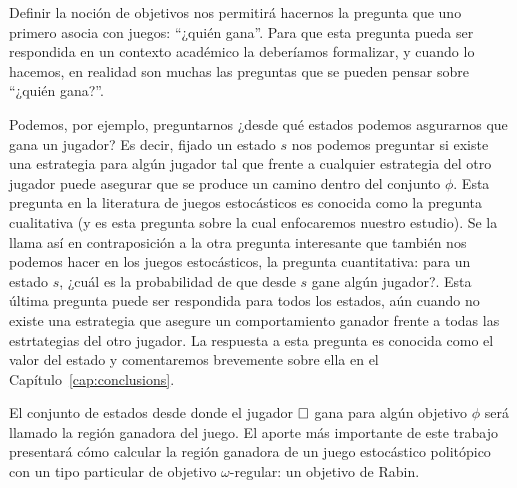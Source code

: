 
Definir la noción de objetivos nos permitirá hacernos la pregunta que uno
primero asocia con juegos: ``¿quién gana''. Para que esta pregunta pueda ser
respondida en un contexto académico la deberíamos formalizar, y cuando lo
hacemos, en realidad son muchas las preguntas que se pueden pensar sobre
``¿quién gana?''.

Podemos, por ejemplo, preguntarnos ¿desde qué estados podemos asgurarnos que
gana un jugador? Es decir, fijado un estado $s$ nos podemos preguntar si existe
una estrategia para algún jugador tal que frente a cualquier estrategia del
otro jugador puede asegurar que se produce un camino dentro del conjunto
$\phi$. Esta pregunta en la literatura de juegos estocásticos es conocida como
la pregunta cualitativa (y es esta pregunta sobre la cual enfocaremos nuestro
estudio). Se la llama así en contraposición a la otra pregunta interesante que
también nos podemos hacer en los juegos estocásticos, la pregunta cuantitativa:
para un estado $s$, ¿cuál es la probabilidad de que desde $s$ gane algún
jugador?. Esta última pregunta puede ser respondida para todos los estados, aún
cuando no existe una estrategia que asegure un comportamiento ganador frente a
todas las estrtategias del otro jugador. La respuesta a esta pregunta es
conocida como el valor del estado y comentaremos brevemente sobre ella en el
Capítulo~\ref{cap:conclusions}.

El conjunto de estados desde donde el jugador $\square$ gana para algún objetivo
$\phi$ será llamado la región ganadora del juego. El aporte más importante de
este trabajo presentará cómo calcular la región ganadora de un juego
estocástico politópico con un tipo particular de objetivo $\omega$-regular: un
objetivo de Rabin.



